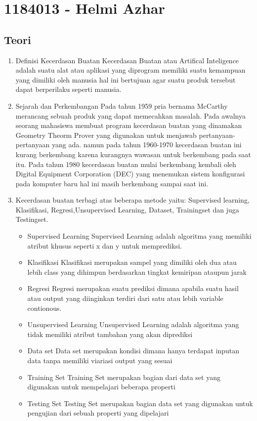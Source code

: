 \section{1184013 - Helmi Azhar}
\subsection{Teori}
\begin{enumerate}

	\item Definisi Kecerdasan Buatan
	\hfill\break
	Kecerdasan Buatan atau Artifical Inteligence adalah suatu alat atau aplikasi yang diprogram memiliki suatu kemampuan yang dimiliki oleh manusia hal ini bertujuan agar suatu produk tersebut dapat berperilaku seperti manusia.

	\item Sejarah dan Perkembangan
	\hfill\break
Pada tahun 1959 pria bernama McCarthy merancang sebuah produk yang dapat memecahkan masalah. Pada awalnya seorang mahasiswa membuat program kecerdasan buatan yang dinamakan Geometry Theorm Prover yang digunakan untuk menjawab pertanyaan-pertanyaan yang ada. namun pada tahun 1960-1970 kecerdasan buatan ini kurang berkembang karena kurangnya wawasan untuk berkembang pada saat itu. Pada tahun 1980 kecerdasan buatan mulai berkembang kembali oleh Digital Equipment Corporation (DEC) yang menemukan sistem konfigurasi pada komputer baru hal ini masih berkembang sampai saat ini.

	\item Kecerdasan buatan terbagi atas beberapa metode yaitu:
	\hfill\break
	Supervised learning,  Klasifikasi, Regresi,Unsupervised Learning, Dataset, Trainingset dan juga Testingset.
	\begin{itemize}
		\item Supervised Learning
		\hfill\break
	Supervised Learning	adalah algoritma yang memiliki atribut khusus seperti x dan y untuk memprediksi.
		\item Klasifikasi
		\hfill\break
		Klasifikasi merupakan sampel yang dimiliki oleh dua atau lebih class yang dihimpun berdasarkan tingkat kemiripan ataupun jarak 
		\item Regresi
		\hfill\break
Regresi	merupakan suatu prediksi dimana apabila suatu hasil atau output yang diinginkan terdiri dari satu atau lebih variable contionous.
		\item Unsupervised Learning 
		\hfill\break
Unsupervised Learning  adalah algoritma yang tidak memiliki atribut tambahan yang akan diprediksi
		\item Data set
		\hfill\break
Data set	merupakan kondisi dimana hanya terdapat inputan data tanpa memiliki viariasi output yang sesuai
		\item Training Set
		\hfill\break
	Training Set	merupakan bagian dari data set yang digunakan untuk mempelajari beberapa properti		
		\item Testing Set
		\hfill\break
Testing Set	merupakan bagian data set yang digunakan untuk pengujian dari sebuah properti yang dipelajari
	\end{itemize}
\end{enumerate}
